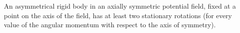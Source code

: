 An asymmetrical rigid body in an axially symmetric potential field, fixed at a point on the axis of the field, has at least two stationary rotations (for every value of the angular momentum with respect to the axis of symmetry).
